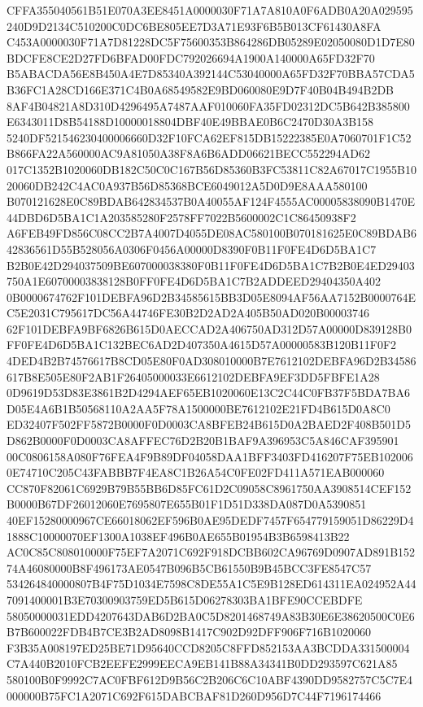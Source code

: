 \documentclass[UTF8,fontset=fandol,zihao=-4,a4paper]{ctexart}
\begin{document}
{{CFFA355040561B51E070A3EE8451A0000030F71A7A810A0F6ADB0A20A029595240D9D2134C510200C0DC6BE805EE7D3A71E93F6B5B013CF61430A8FA
C453A0000030F71A7D81228DC5F75600353B864286DB05289E02050080D1D7E80BDCFE8CE2D27FD6BFAD00FDC792026694A1900A140000A65FD32F70
B5ABACDA56E8B450A4E7D85340A392144C53040000A65FD32F70BBA57CDA5B36FC1A28CD166E371C4B0A68549582E9BD060080E9D7F40B04B494B2DB
8AF4B04821A8D310D4296495A7487AAF010060FA35FD02312DC5B642B385800E6343011D8B54188D10000018804DBF40E49BBAE0B6C2470D30A3B158
5240DF521546230400006660D32F10FCA62EF815DB15222385E0A7060701F1C52B866FA22A560000AC9A81050A38F8A6B6ADD06621BECC552294AD62
017C1352B1020060DB182C50C0C167B56D85360B3FC53811C82A67017C1955B1020060DB242C4AC0A937B56D85368BCE6049012A5D0D9E8AAA580100
B070121628E0C89BDAB642834537B0A40055AF124F4555AC00005838090B1470E44DBD6D5BA1C1A203585280F2578FF7022B5600002C1C86450938F2
A6FEB49FD856C08CC2B7A4007D4055DE08AC580100B070181625E0C89BDAB642836561D55B528056A0306F0456A00000D8390F0B11F0FE4D6D5BA1C7
B2B0E42D294037509BE607000038380F0B11F0FE4D6D5BA1C7B2B0E4ED29403750A1E60700003838128B0FF0FE4D6D5BA1C7B2ADDEED29404350A402
0B0000674762F101DEBFA96D2B34585615BB3D05E8094AF56AA7152B0000764EC5E2031C795617DC56A44746FE30B2D2AD2A405B50AD020B00003746
62F101DEBFA9BF6826B615D0AECCAD2A406750AD312D57A00000D839128B0FF0FE4D6D5BA1C132BEC6AD2D407350A4615D57A00000583B120B11F0F2
4DED4B2B74576617B8CD05E80F0AD308010000B7E7612102DEBFA96D2B34586617B8E505E80F2AB1F26405000033E6612102DEBFA9EF3DD5FBFE1A28
0D9619D53D83E3861B2D4294AEF65EB1020060E13C2C44C0FB37F5BDA7BA6D05E4A6B1B50568110A2AA5F78A1500000BE7612102E21FD4B615D0A8C0
ED32407F502FF5872B0000F0D0003CA8BFEB24B615D0A2BAED2F408B501D5D862B0000F0D0003CA8AFFEC76D2B20B1BAF9A396953C5A846CAF395901
00C0806158A080F76FEA4F9B89DF04058DAA1BFF3403FD416207F75EB1020060E74710C205C43FABBB7F4EA8C1B26A54C0FE02FD411A571EAB000060
CC870F82061C6929B79B55BB6D85FC61D2C09058C8961750AA3908514CEF152B0000B67DF26012060E7695807E655B01F1D51D338DA087D0A5390851
40EF15280000967CE66018062EF596B0AE95DEDF7457F654779159051D86229D41888C10000070EF1300A1038EF496B0AE655B01954B3B6598413B22
AC0C85C808010000F75EF7A2071C692F918DCBB602CA96769D0907AD891B15274A46080000B8F496173AE0547B096B5CB61550B9B45BCC3FE8547C57
534264840000807B4F75D1034E7598C8DE55A1C5E9B128ED614311EA024952A447091400001B3E70300903759ED5B615D06278303BA1BFE90CCEBDFE
58050000031EDD4207643DAB6D2BA0C5D8201468749A83B30E6E38620500C0E6B7B600022FDB4B7CE3B2AD8098B1417C902D92DFF906F716B1020060
F3B35A008197ED25BE71D95640CCD8205C8FFD852153AA3BCDDA331500004C7A440B2010FCB2EEFE2999EECA9EB141B88A34341B0DD293597C621A85
580100B0F9992C7AC0FBF612D9B56C2B206C6C10ABF4390DD9582757C5C7E4000000B75FC1A2071C692F615DABCBAF81D260D956D7C44F7196174466
}}
\end{document}

